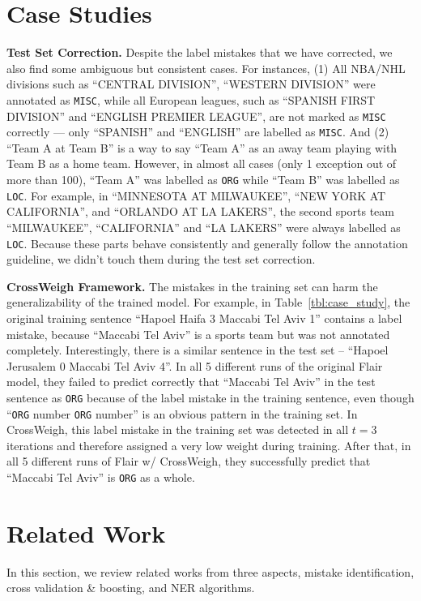 \documentclass[11pt,a4paper]{article}
\newcommand{\our}{\mbox{\sf CrossWeigh}\xspace}
\newcommand{\smallsection}[1]{{\noindent\textbf{#1.}}}
\begin{document}
\section{Case Studies} \label{sec:case}
\smallsection{Test Set Correction}
Despite the label mistakes that we have corrected, we also find some ambiguous but consistent cases.
For instances,
(1) All NBA/NHL divisions such as ``CENTRAL DIVISION'', ``WESTERN DIVISION'' were annotated as \texttt{MISC}, while all European leagues, such as ``SPANISH FIRST DIVISION'' and ``ENGLISH PREMIER LEAGUE'', are not marked as \texttt{MISC} correctly --- only ``SPANISH'' and ``ENGLISH'' are labelled as \texttt{MISC}. 
And (2) ``Team A at Team B'' is a way to say ``Team A'' as an away team playing with Team B as a home team. 
However, in almost all cases (only 1 exception out of more than 100), ``Team A'' was labelled as \texttt{ORG} while ``Team B'' was labelled as \texttt{LOC}. 
For example, in ``MINNESOTA AT MILWAUKEE'', ``NEW YORK AT CALIFORNIA'', and ``ORLANDO AT LA LAKERS'', the second sports team ``MILWAUKEE'', ``CALIFORNIA'' and ``LA LAKERS'' were always labelled as \texttt{LOC}.
Because these parts behave consistently and generally follow the annotation guideline,
we didn't touch them during the test set correction. 


\smallsection{CrossWeigh Framework}
    The mistakes in the training set can harm the generalizability of the trained model. 
    For example, in Table~\ref{tbl:case_study}, the original training sentence ``Hapoel Haifa 3 Maccabi Tel Aviv 1'' contains a label mistake, because ``Maccabi Tel Aviv'' is a sports team but was not annotated completely. 
    Interestingly, there is a similar sentence in the test set -- ``Hapoel Jerusalem 0 Maccabi Tel Aviv 4''.
    In all 5 different runs of the original Flair model, they failed to predict correctly that ``Maccabi Tel Aviv'' in the test sentence as \texttt{ORG} because of the label mistake in the training sentence, even though ``\texttt{ORG} number \texttt{ORG} number'' is an obvious pattern in the training set.
In \our, this label mistake in the training set was detected in all $t=3$ iterations and therefore assigned a very low weight during training. 
    After that, in all 5 different runs of Flair w/ \our, they successfully predict that ``Maccabi Tel Aviv'' is \texttt{ORG} as a whole.





 \section{Related Work}\label{sec:rel}
In this section, we review related works from three aspects, mistake identification, cross validation \& boosting, and NER algorithms.
\end{document}
